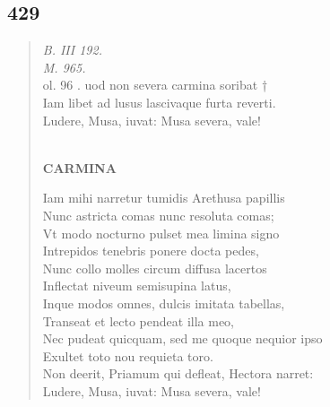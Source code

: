 \documentclass[11pt, a4paper]{report}
\begin{document}
            \subsection*{429}
      \begin{verse}
      \textit{B. III 192.} \\ \textit{M. 965.} \\ ol. 96 . uod non severa carmina soribat † \\ Iam libet ad lusus lascivaque furta reverti. \\ Ludere, Musa, iuvat: Musa severa, vale! \\ 
        ﻿\pagebreak 
    \begin{center} \textbf{CARMINA} \end{center} \marginpar{[328]} Iam mihi narretur tumidis Arethusa papillis \\ Nunc astricta comas nunc resoluta comas; \\ Vt modo nocturno pulset mea limina signo \\ Intrepidos tenebris ponere docta pedes, \\ Nunc collo molles circum diffusa lacertos \\ Inflectat niveum semisupina latus, \\ Inque modos omnes, dulcis imitata tabellas, \\ Transeat et lecto pendeat illa meo, \\ Nec pudeat quicquam, sed me quoque nequior ipso \\ Exultet toto nou requieta toro. \\ Non deerit, Priamum qui defleat, Hectora narret: \\ Ludere, Musa, iuvat: Musa severa, vale! \\ 
      \end{verse}
  
\end{document}
